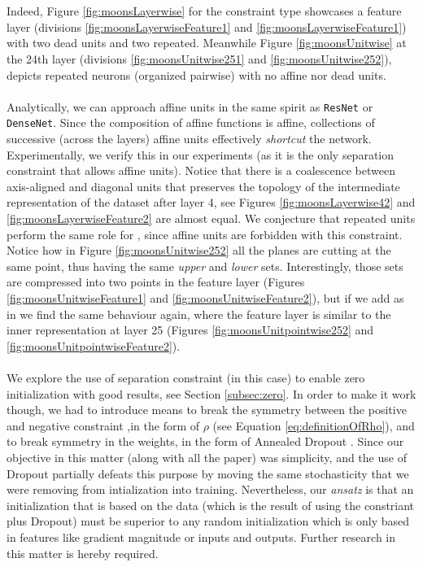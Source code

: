\\\\
Indeed, Figure \ref{fig:moonsLayerwise} for the \SepLayer constraint type showcases a feature layer (divisions \ref{fig:moonsLayerwiseFeature1} and \ref{fig:moonsLayerwiseFeature1}) with two dead units and two repeated. Meanwhile Figure \ref{fig:moonsUnitwise} at the 24th layer (divisions \ref{fig:moonsUnitwise251} and \ref{fig:moonsUnitwise252}), depicts repeated neurons (organized pairwise) with no affine nor dead units. 
\\\\
Analytically, we can approach affine units in the same spirit as \texttt{ResNet} \cite{resnet} or \texttt{DenseNet}\cite{densenet}. Since the composition of affine functions is affine, collections of successive (across the layers) affine units effectively \emph{shortcut} the network. Experimentally, we verify this in our \SepLayer experiments (as it is the only separation constraint that allows affine units). Notice that there is a coalescence between axis-aligned and diagonal units that preserves the topology of the intermediate representation of the dataset after layer 4, see Figures \ref{fig:moonsLayerwise42} and \ref{fig:moonsLayerwiseFeature2} are almost equal. We conjecture that repeated units perform the same role for \SepUnit, since affine units are forbidden with this constraint. Notice how in Figure \ref{fig:moonsUnitwise252} all the planes are cutting at the same point, thus having the same \emph{upper} and \emph{lower} sets. Interestingly, those sets are compressed into two points in the feature layer (Figures \ref{fig:moonsUnitwiseFeature1} and \ref{fig:moonsUnitwiseFeature2}), but if we add \SepPoint as in \SepUnitPoint we find the same behaviour again, where the feature layer is similar to the inner representation at layer 25 (Figures \ref{fig:moonsUnitpointwise252} and \ref{fig:moonsUnitpointwiseFeature2}). 
\\\\
We explore the use of separation constraint (\SepUnitPoint in this case) to enable zero initialization with good results, see Section \ref{subsec:zero}. In order to make it work though, we had to introduce  means to break the symmetry between the positive and negative constraint ,in the form of $\rho$ (see Equation \ref{eq:definitionOfRho}), and to break symmetry in the weights, in the form of Annealed Dropout \cite{dropoutAnnealing}. Since our objective in this matter (along with all the paper) was simplicity, and the use of Dropout partially defeats this purpose by moving the same stochasticity that we were removing from intialization into training. Nevertheless, our \emph{ansatz} is that an initialization that is based on the data (which is the result of using the constriant plus Dropout) must be superior to any random initialization which is only based in features like gradient magnitude or inputs and outputs. Further research in this matter is hereby required.






